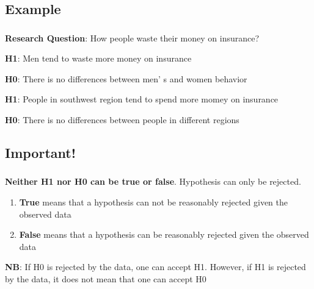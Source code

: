 \documentclass[t, 11pt]{beamer}
\newcommand\Warning{%
	\makebox[1.4em][c]{%
		\makebox[0pt][c]{\raisebox{.1em}{\small!}}%
		\makebox[0pt][c]{\color{red}\Large$\bigtriangleup$}}}%
\begin{document}
    \subsection{Example}
    
    	\begin{frame}
    	\frametitle{\insertsection} 
    	\framesubtitle{\insertsubsection} 
    	\textbf{Research Question}: How people waste their money on insurance?
    	
    	\textbf{H1}: Men tend to waste more money on insurance 
    	
    	\textbf{H0}: There is no differences between men' s and women behavior 
    	
    	\textbf{H1}: People in southwest region tend to spend more momey on insurance
    	
    	\textbf{H0}: There is no differences between people in different regions 
    	
    \end{frame}		

    \subsection{Important!}


    	\begin{frame}
	\frametitle{\insertsection} 
	\framesubtitle{\insertsubsection} 
	
	
	\Warning  \textbf{Neither H1 nor H0 can be true or false}. Hypothesis can only be rejected. 
	
	\vspace{1cm}
	
	\begin{enumerate}
     	\item \textbf{True} means that a hypothesis can not be reasonably rejected given the observed data 
		\item \textbf{False} means that a hypothesis can be reasonably rejected given the observed data
	\end{enumerate}
	
	\vspace{1cm}
	
		\textbf{NB}: If H0 is rejected by the data, one can accept H1. However, if H1 is rejected by the data, it does not mean that one can accept H0
		
	\end{frame}		
\end{document}
